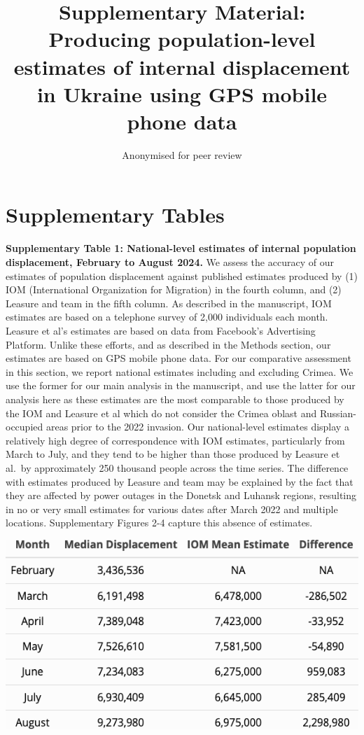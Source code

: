 \documentclass[
  11pt,
]{article}
\title{\textbf{Supplementary Material: Producing population-level
estimates of internal displacement in Ukraine using GPS mobile phone
data}}
\author{Anonymised for peer review}
\date{}
\begin{document}
\maketitle


\newpage

\section{Supplementary Tables}\label{supplementary-tables}

\textbf{Supplementary Table 1: National-level estimates of internal
population displacement, February to August 2024.} We assess the
accuracy of our estimates of population displacement against published
estimates produced by (1) IOM (International Organization for Migration)
in the fourth column, and (2) Leasure and team in the fifth column. As
described in the manuscript, IOM estimates are based on a telephone
survey of 2,000 individuals each month. Leasure et al's estimates are
based on data from Facebook's Advertising Platform. Unlike these
efforts, and as described in the Methods section, our estimates are
based on GPS mobile phone data. For our comparative assessment in this
section, we report national estimates including and excluding Crimea. We
use the former for our main analysis in the manuscript, and use the
latter for our analysis here as these estimates are the most comparable
to those produced by the IOM and Leasure et al which do not consider the
Crimea oblast and Russian-occupied areas prior to the 2022 invasion. Our
national-level estimates display a relatively high degree of
correspondence with IOM estimates, particularly from March to July, and
they tend to be higher than those produced by Leasure et al.~by
approximately 250 thousand people across the time series. The difference
with estimates produced by Leasure and team may be explained by the fact
that they are affected by power outages in the Donetsk and Luhansk
regions, resulting in no or very small estimates for various dates after
March 2022 and multiple locations. Supplementary Figures 2-4 capture
this absence of estimates.

\label{tab-national}
\begin{center}
\includegraphics[width=0.6\linewidth,height=\textheight,keepaspectratio]{../outputs/sm/tables/table_all_estimates.png}
\end{center}
\end{document}
